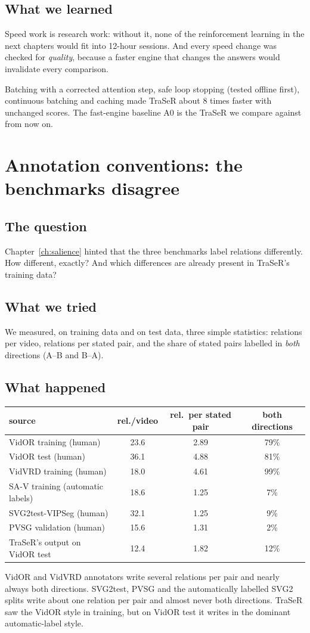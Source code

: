 \documentclass[11pt,openany]{book}
\newcommand{\qsec}{\section*{The question}}
\newcommand{\tsec}{\section*{What we tried}}
\newcommand{\hsec}{\section*{What happened}}
\newcommand{\lsec}{\section*{What we learned}}
\begin{document}
\lsec
Speed work is research work: without it, none of the reinforcement learning in the next chapters would fit into 12-hour sessions.
And every speed change was checked for \emph{quality}, because a faster engine that changes the answers would invalidate every
comparison.

\begin{summarybox}
Batching with a corrected attention step, safe loop stopping (tested offline first), continuous batching and caching made TraSeR
about 8 times faster with unchanged scores. The fast-engine baseline A0 is the TraSeR we compare against from now on.
\end{summarybox}

\chapter{Annotation conventions: the benchmarks disagree}\label{ch:conventions}

\qsec
Chapter~\ref{ch:salience} hinted that the three benchmarks label relations differently. How different, exactly? And which
differences are already present in TraSeR's training data?

\tsec
We measured, on training data and on test data, three simple statistics: relations per video, relations per stated pair, and the
share of stated pairs labelled in \emph{both} directions (A--B and B--A).

\hsec
\begin{center}
\small
\begin{tabular}{@{}lccc@{}}
\toprule
source & rel./video & rel.\ per stated pair & both directions \\
\midrule
VidOR training (human) & 23.6 & 2.89 & 79\% \\
VidOR test (human) & 36.1 & 4.88 & 81\% \\
VidVRD training (human) & 18.0 & 4.61 & 99\% \\
SA-V training (automatic labels) & 18.6 & 1.25 & 7\% \\
SVG2test-VIPSeg (human) & 32.1 & 1.25 & 9\% \\
PVSG validation (human) & 15.6 & 1.31 & 2\% \\
\midrule
TraSeR's output on VidOR test & 12.4 & 1.82 & 12\% \\
\bottomrule
\end{tabular}
\end{center}
VidOR and VidVRD annotators write several relations per pair and nearly always both directions. SVG2test, PVSG and the
automatically labelled SVG2 splits write about one relation per pair and almost never both directions. TraSeR saw the VidOR style in
training, but on VidOR test it writes in the dominant automatic-label style.
\end{document}
